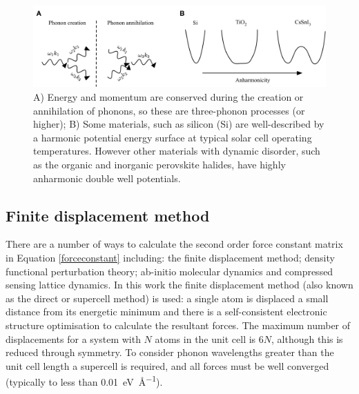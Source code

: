 \begin{figure}[h]
\centering
  \includegraphics[width=1.0\columnwidth]{figures/ch3/anharmonicity.png}
  \caption[3-phonon processes and anharmonic potential energy surfaces]{A) Energy and momentum are conserved during the creation or annihilation of phonons, so these are three-phonon processes (or higher); B) Some materials, such as silicon (Si) are well-described by a harmonic potential energy surface at typical solar cell operating temperatures. However other materials with dynamic disorder, such as the organic and inorganic perovskite halides, have highly anharmonic double well potentials.}
  \label{anharmonicity}
\end{figure}  %



\subsection{Finite displacement method} \label{finitedisplacement}

There are a number of ways to calculate the second order force constant matrix in Equation \ref{forceconstant} including: the finite displacement method; density functional perturbation theory; ab-initio molecular dynamics and compressed sensing lattice dynamics.
In this work the finite displacement method (also known as the direct or supercell method) is used: a single atom is displaced a small distance from its energetic minimum and there is a self-consistent electronic structure optimisation to calculate the resultant forces. The maximum number of displacements for a system with $N$ atoms in the unit cell is $6N$, although this is reduced through symmetry. 
To consider phonon wavelengths greater than the unit cell length a supercell is required, and all forces must be well converged (typically to less than \SI{0.01}{\electronvolt\per\angstrom}).



